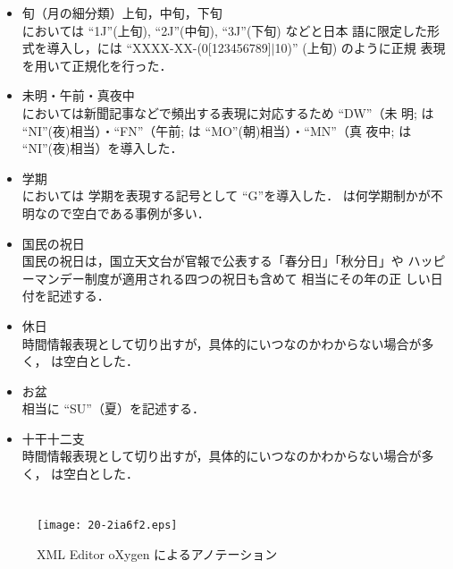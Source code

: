 \documentclass[japanese]{jnlp_1.4}
\newcommand{\modified}[1]{}
\def\value{}
\def\valuefromsurface{}
\begin{document}
\begin{itemize}
\item 旬（月の細分類）上旬，中旬，下旬 \\
\valuefromsurface においては ``1J''(上旬), ``2J''(中旬), ``3J''(下旬) などと日本
語に限定した形式を導入し，\value には ``XXXX-XX-(0[123456789]$|$10)'' (上旬) のように正規
表現を用いて正規化を行った．
\item 未明・午前・真夜中 \\
\valuefromsurface においては新聞記事などで頻出する表現に対応するため ``DW''（未
明; \value は ``NI''(夜)相当）・``FN''（午前; \value は ``MO''(朝)相当）・``MN''（真
夜中; \value は ``NI''(夜)相当）を導入した．
\item 学期 \\
\valuefromsurface においては 学期を表現する記号として ``G''を導入した．
\value は何学期制かが不明なので空白である事例が多い．
\item 国民の祝日 \\
国民の祝日は，国立天文台が官報で公表する「春分日」「秋分日」や
ハッピーマンデー制度が適用される四つの祝日も含めて \value 相当にその年の正
しい日付を記述する．
\pagebreak
\item 休日 \\
時間情報表現として切り出すが，具体的にいつなのかわからない場合が多く，
\value は空白とした．
\item お盆 \\
\value 相当に ``SU''（夏）を記述する．
\item 十干十二支 \\
時間情報表現として切り出すが，具体的にいつなのかわからない場合が多く，
\value は空白とした．
\end{itemize}


\section{\modified{作業環境と作業対象}}

\modified{本節では作業環境と作業対象であるBCCWJについて詳しく説明する．}

\subsection{\modified{作業環境}}

\begin{figure}[b]
\begin{center}
\texttt{[image: 20-2ia6f2.eps]}
\end{center}
\caption{XML Editor oXygen によるアノテーション}
\label{fig:oxygen}
\vspace{-0.5\Cvs}
\end{figure}
\end{document}
